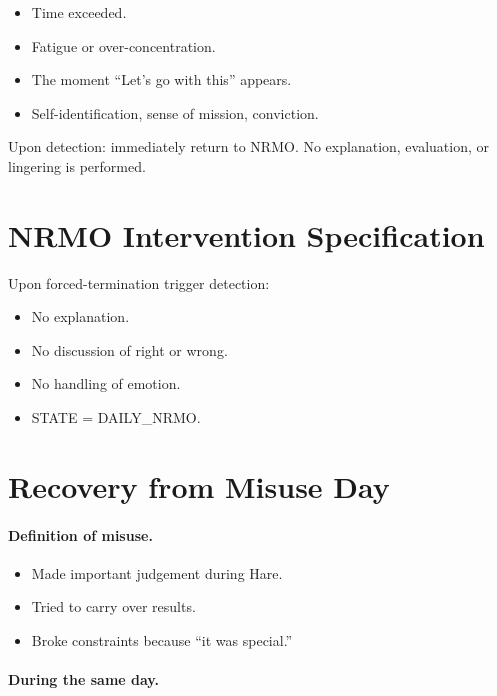 \begin{itemize}
\item Time exceeded.
\item Fatigue or over-concentration.
\item The moment ``Let's go with this'' appears.
\item Self-identification, sense of mission, conviction.
\end{itemize}

\noindent
Upon detection: immediately return to NRMO. No explanation,
evaluation, or lingering is performed.

\section{NRMO Intervention Specification}
\label{sec:hare-intervention}

Upon forced-termination trigger detection:

\begin{itemize}
\item No explanation.
\item No discussion of right or wrong.
\item No handling of emotion.
\item STATE = DAILY\_NRMO.
\end{itemize}

\section{Recovery from Misuse Day}
\label{sec:hare-misuse}

\paragraph{Definition of misuse.}
\begin{itemize}
\item Made important judgement during Hare.
\item Tried to carry over results.
\item Broke constraints because ``it was special.''
\end{itemize}

\paragraph{During the same day.}

